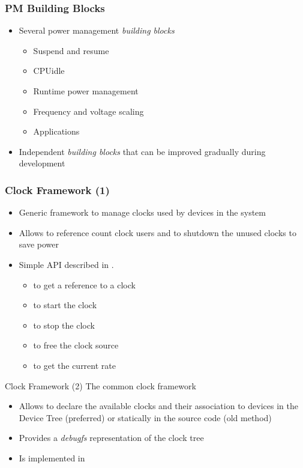 \begin{frame}
  \frametitle{PM Building Blocks}
  \begin{itemize}
  \item Several power management \emph{building blocks}
    \begin{itemize}
    \item Suspend and resume
    \item CPUidle
    \item Runtime power management
    \item Frequency and voltage scaling
    \item Applications
    \end{itemize}
  \item Independent \emph{building blocks} that can be improved
    gradually during development
  \end{itemize}
\end{frame}

\begin{frame}
  \frametitle{Clock Framework (1)}
  \begin{itemize}
  \item Generic framework to manage clocks used by devices in the
    system
  \item Allows to reference count clock users and to shutdown the
    unused clocks to save power
  \item Simple API described in .
    \begin{itemize}
    \item {} to get a reference to a clock
    \item {} to start the clock
    \item {} to stop the clock
    \item {} to free the clock source
    \item {} to get the current rate
    \end{itemize}
  \end{itemize}
\end{frame}


\begin{frame}{Clock Framework (2)}
  The common clock framework
  \begin{itemize}
  \item Allows to declare the available clocks and their association
    to devices in the Device Tree (preferred) or statically in the
    source code (old method)
  \item Provides a {\em debugfs} representation of the clock tree
  \item Is implemented in 
  \end{itemize}
\end{frame}

